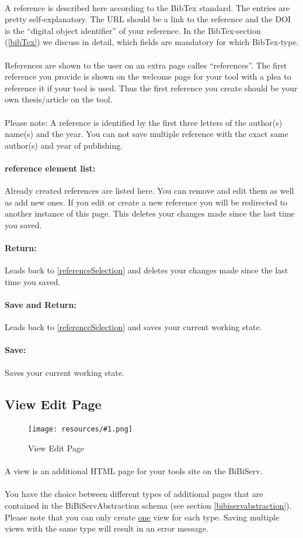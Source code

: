 \documentclass[a4paper,10pt]{book}
\newcommand{\bigpic}[1]{\texttt{[image: resources/\#1.png]}}
\newcommand{\buttonsDetail}[1]{
\paragraph{Return:} Leads back to #1 and deletes your changes made since the last time you saved.
\paragraph{Save and Return:} Leads back to #1 and saves your current working state.
\paragraph{Save:} Saves your current working state.
}
\newcommand{\newElem}[2]{
\paragraph{#1 element list:} Already created #1s are listed here. You can remove and edit them as well as add new ones. If you edit or create a new #1 you will be redirected to #2. This deletes your changes made since the last time you saved.
}
\begin{document}
\paragraph{} A reference is described here according to the BibTex standard. The entries are pretty self-explanatory. The URL should be a link to the reference and the DOI is the ``digital object identifier'' of your reference. In the BibTex-section (\ref{bibTex}) we discuss in detail, which fields are mandatory for which BibTex-type.
\paragraph{} References are shown to the user on an extra page calles ``references''. The first reference you provide is shown on the welcome page for your tool with a plea to reference it if your tool is used. Thus the first reference you create should be your own thesis/article on the tool.
\paragraph{} Please note: A reference is identified by the first three letters of the author(s) name(s) and the year. You can not save multiple reference with the exact same author(s) and year of publishing.
\newElem{reference}{another instance of this page}
\buttonsDetail{\ref{referenceSelection}}

\subsection{View Edit Page}
\label{view}

\begin{figure}
 \bigpic{view}
 \caption{View Edit Page}
\end{figure}

\paragraph{}A view is an additional HTML page for your tools site on the BiBiServ.
\paragraph{}You have the choice between different types of additional pages that are contained in the BiBiServAbstraction schema (see section \ref{bibiservabstraction}). Please note that you can only create \underline{one} view for each type. Saving multiple views with the same type will result in an error message.
\end{document}
